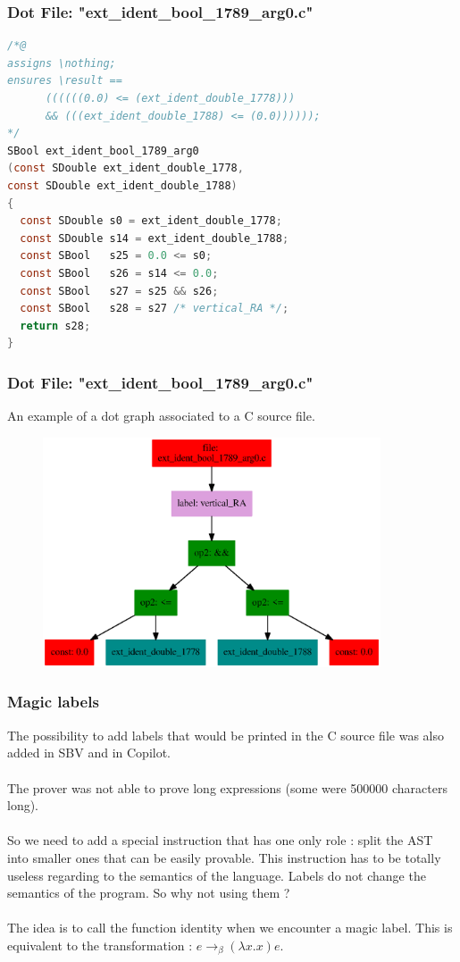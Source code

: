 \documentclass{beamer}
\begin{document}
\begin{frame}[fragile]
	\frametitle{Dot File: "ext\_ident\_bool\_1789\_arg0.c"}
	\footnotesize 
\begin{lstlisting}[language=C]
/*@
assigns \nothing;
ensures \result == 
      ((((((0.0) <= (ext_ident_double_1778))) 
      && (((ext_ident_double_1788) <= (0.0))))));
*/
SBool ext_ident_bool_1789_arg0
(const SDouble ext_ident_double_1778,
const SDouble ext_ident_double_1788)
{
  const SDouble s0 = ext_ident_double_1778;
  const SDouble s14 = ext_ident_double_1788;
  const SBool   s25 = 0.0 <= s0;
  const SBool   s26 = s14 <= 0.0;
  const SBool   s27 = s25 && s26;
  const SBool   s28 = s27 /* vertical_RA */;
  return s28;
}
\end{lstlisting}
\end{frame}

\begin{frame}[fragile]
	\frametitle{Dot File: "ext\_ident\_bool\_1789\_arg0.c"}
	An example of a dot graph associated to a C source file.\\
	\begin{figure}
		\includegraphics[width=100mm]{images/graph.ps}
	\end{figure}
	
\end{frame}

\begin{frame}[fragile]
	\frametitle{Magic labels}
	The possibility to add labels that would be printed in the C source file was also added in SBV and in Copilot. \\~\\
	The prover was not able to prove long expressions (some were 500000 characters long).\\~\\
	So we need to add a special instruction that has one only role : split the AST into smaller ones that can be easily provable. This instruction has to be totally useless regarding to the semantics of the language. Labels do not change the semantics of the program. So why not using them ? \\~\\
	The idea is to call the function identity when we encounter a magic label. This is equivalent to the transformation : $ e \rightarrow_{\beta} (\lambda x . x) e $. 

\end{frame}
\end{document}
